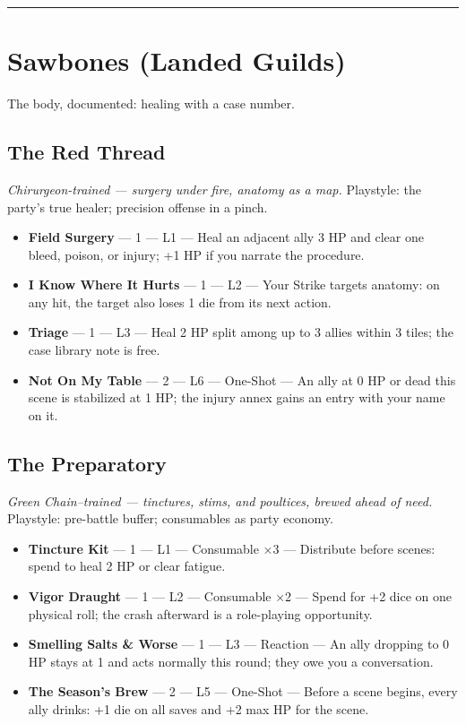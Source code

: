\medskip\hrule\medskip

\section{Sawbones \textnormal{(Landed Guilds)}}

The body, documented: healing with a case number.

\subsection{The Red Thread}
\textit{Chirurgeon-trained --- surgery under fire, anatomy as a map.} Playstyle: the party's true healer; precision offense in a pinch.
\begin{itemize}
    \item \textbf{Field Surgery} --- 1 --- L1 --- Heal an adjacent ally 3 HP and clear one bleed, poison, or injury; +1 HP if you narrate the procedure.
    \item \textbf{I Know Where It Hurts} --- 1 --- L2 --- Your Strike targets anatomy: on any hit, the target also loses 1 die from its next action.
    \item \textbf{Triage} --- 1 --- L3 --- Heal 2 HP split among up to 3 allies within 3 tiles; the case library note is free.
    \item \textbf{Not On My Table} --- 2 --- L6 --- One-Shot --- An ally at 0 HP or dead this scene is stabilized at 1 HP; the injury annex gains an entry with your name on it.
\end{itemize}

\subsection{The Preparatory}
\textit{Green Chain--trained --- tinctures, stims, and poultices, brewed ahead of need.} Playstyle: pre-battle buffer; consumables as party economy.
\begin{itemize}
    \item \textbf{Tincture Kit} --- 1 --- L1 --- Consumable ×3 --- Distribute before scenes: spend to heal 2 HP or clear fatigue.
    \item \textbf{Vigor Draught} --- 1 --- L2 --- Consumable ×2 --- Spend for +2 dice on one physical roll; the crash afterward is a role-playing opportunity.
    \item \textbf{Smelling Salts \& Worse} --- 1 --- L3 --- Reaction --- An ally dropping to 0 HP stays at 1 and acts normally this round; they owe you a conversation.
    \item \textbf{The Season's Brew} --- 2 --- L5 --- One-Shot --- Before a scene begins, every ally drinks: +1 die on all saves and +2 max HP for the scene.
\end{itemize}

